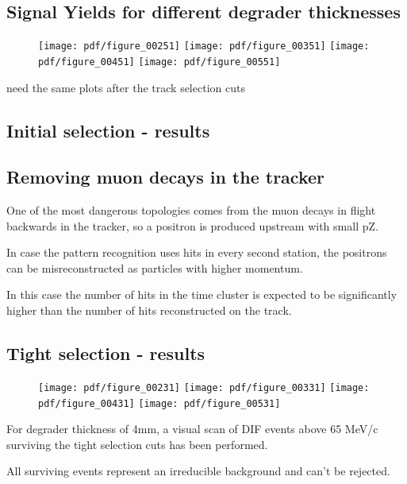\subsection {Signal Yields for different degrader thicknesses}
\begin{figure}[H]
  \texttt{[image: pdf/figure\_00251]}
  \texttt{[image: pdf/figure\_00351]}
  \texttt{[image: pdf/figure\_00451]}
  \texttt{[image: pdf/figure\_00551]}
  \caption{
  }
\end{figure}

{\red need the same plots after the track selection cuts}

\subsection{Initial selection - results}




\subsection{Removing muon decays in the tracker}

One of the most dangerous topologies comes from the muon decays in flight backwards in the tracker,
so a positron is produced upstream with small pZ.

In case the pattern recognition uses hits in every second station, the positrons can be misreconstructed
as particles with higher momentum.

In this case the number of hits in the time cluster is expected to be significantly higher
than the number of hits reconstructed on the track.

\subsection{Tight selection - results}


\begin{figure}[H]
  \texttt{[image: pdf/figure\_00231]}
  \texttt{[image: pdf/figure\_00331]}
  \texttt{[image: pdf/figure\_00431]}
  \texttt{[image: pdf/figure\_00531]}
  \caption{
    \label{fig:deg_3mm_mom}
  }
\end{figure}

For degrader thickness of 4mm, a visual scan of DIF events above 65 MeV/c surviving
the tight selection cuts has been performed.

All surviving events represent an irreducible background and can't be rejected.

